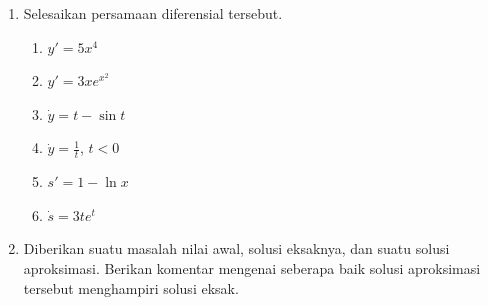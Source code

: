 \begin{enumerate}
\begin{enumerate}
\item \label{exc:odePendulum-8}$y(t)=4e^{t}$; $\dot{y}=y$, $y(0)=4$ \hasananswer 
\item $y(x)=x^{3}-\sin x-\pi^{3}$; $y'=3x^{2}-\cos x$, $y(\pi)=0$
\item \label{exc:odePendulum-9}$s(t)=\frac{1}{2}\left(1+e^{-t^{2}}\right)$;
$\dot{s}=(1-2s)t$, $s(0)=1$ \hasananswer 
\item \label{exc:odePendulum-10}$f(x)=\frac{x^{3}}{4}+\frac{16}{x}$, $x>0$;
$f'=-\frac{f}{x}+x^{2}$, $f(4)=20$ \hasasolution 
\item $h(x)=-2x-1$; $h'=\frac{1+4x-h}{2h+x+1}$, $h(0)=-1$
\item \label{exc:odePendulum-11}$r(t)=\sqrt{t}-3$, $t>0$; $\ddot{r}\dot{r}t^{2}=-\frac{1}{8}$,
$r(9)=0$, $\dot{r}(9)=\frac{1}{6}$. \hasananswer  PETUNJUK: Solusi
harus memenuhi PDB tersebut dan kedua syarat, $r(9)=0$ dan $\dot{r}(9)=\frac{1}{6}$.
\end{enumerate}
\item Selesaikan persamaan diferensial tersebut.

\begin{enumerate}
\item \label{exc:odePendulum-12}$y'=5x^{4}$ \hasananswer 
\item $y'=3xe^{x^{2}}$
\item \label{exc:odePendulum-13}$\dot{y}=t-\sin t$ \hasasolution 
\item \label{exc:odePendulum-14}$\dot{y}=\frac{1}{t}$, $t<0$ \hasananswer 
\item $s'=1-\ln x$
\item \label{exc:odePendulum-15}$\dot{s}=3te^{t}$ \hasananswer 
\end{enumerate}
\item Diberikan suatu masalah nilai awal, solusi eksaknya, dan suatu solusi
aproksimasi. Berikan komentar mengenai seberapa baik solusi aproksimasi
tersebut menghampiri solusi eksak.


\end{enumerate}
